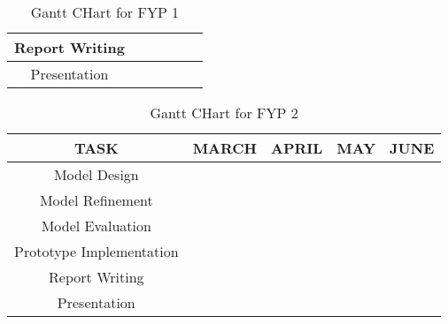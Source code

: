 \begin{table}[]
\begin{tabular}{|c|c|c|c|c|c|}
Report Writing                                                                          & \cellcolor[HTML]{FFCB2F} & \cellcolor[HTML]{FFCB2F} & \cellcolor[HTML]{FFCB2F} & \cellcolor[HTML]{FFCB2F} & \cellcolor[HTML]{FFCB2F} \\ \hline
Presentation                                                                            & \cellcolor[HTML]{EFEFEF} & \cellcolor[HTML]{EFEFEF} & \cellcolor[HTML]{EFEFEF} & \cellcolor[HTML]{EFEFEF} & \cellcolor[HTML]{FFCB2F} \\ \hline
\end{tabular}
\caption{Gantt CHart for FYP 1}
\label{tab:gantt-chart-fyp1}
\end{table}


\begin{table}[]
\begin{tabular}{|c|c|c|c|c|}
\hline
\textbf{TASK}            & \textbf{MARCH}           & \textbf{APRIL}           & \textbf{MAY}             & \textbf{JUNE}                                   \\ \hline
Model Design             & \cellcolor[HTML]{FFCB2F} & \cellcolor[HTML]{EFEFEF} & \cellcolor[HTML]{EFEFEF} & \cellcolor[HTML]{EFEFEF}                        \\ \hline
Model Refinement         & \cellcolor[HTML]{EFEFEF} & \cellcolor[HTML]{FFCB2F} & \cellcolor[HTML]{FFCB2F} & \cellcolor[HTML]{EFEFEF}                        \\ \hline
Model Evaluation         & \cellcolor[HTML]{EFEFEF} & \cellcolor[HTML]{FFCB2F} & \cellcolor[HTML]{FFCB2F} & \cellcolor[HTML]{EFEFEF}                        \\ \hline
Prototype Implementation & \cellcolor[HTML]{EFEFEF} & \cellcolor[HTML]{EFEFEF} & \cellcolor[HTML]{FFCB2F} & \cellcolor[HTML]{FFCB2F}                        \\ \hline
Report Writing           & \cellcolor[HTML]{FFCB2F} & \cellcolor[HTML]{FFCB2F} & \cellcolor[HTML]{FFCB2F} & \cellcolor[HTML]{FFCB2F}                        \\ \hline
Presentation             & \cellcolor[HTML]{EFEFEF} & \cellcolor[HTML]{EFEFEF} & \cellcolor[HTML]{EFEFEF} & \cellcolor[HTML]{FFCB2F}{\color[HTML]{FFCB2F} } \\ \hline
\end{tabular}
\caption{Gantt CHart for FYP 2}
\label{tab:gantt-chart-fyp2}
\end{table}
